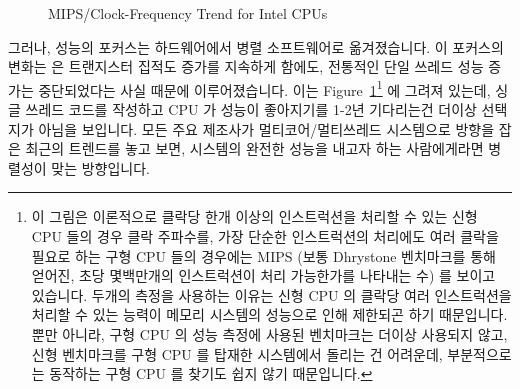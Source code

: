 \begin{figure}[tb]
\centering
{}
\caption{MIPS/Clock-Frequency Trend for Intel CPUs}
\label{fig:intro:Clock-Frequency Trend for Intel CPUs}
\end{figure}

그러나, 성능의 포커스는 하드웨어에서 병렬 소프트웨어로 옮겨졌습니다.
이 포커스의 변화는  은 트랜지스터 집적도 증가를 지속하게
함에도, 전통적인 단일 쓰레드 성능 증가는 중단되었다는 사실 때문에
이루어졌습니다.
이는
Figure~\ref{fig:intro:Clock-Frequency Trend for Intel CPUs}\footnote{
	이 그림은 이론적으로 클락당 한개 이상의 인스트럭션을 처리할 수 있는
	신형 CPU 들의 경우 클락 주파수를, 가장 단순한 인스트럭션의 처리에도
	여러 클락을 필요로 하는 구형 CPU 들의 경우에는 MIPS (보통 Dhrystone
	벤치마크를 통해 얻어진, 초당 몇백만개의 인스트럭션이 처리 가능한가를
	나타내는 수) 를 보이고 있습니다.
	두개의 측정을 사용하는 이유는 신형 CPU 의 클락당 여러 인스트럭션을
	처리할 수 있는 능력이 메모리 시스템의 성능으로 인해 제한되곤 하기
	때문입니다.
	뿐만 아니라, 구형 CPU 의 성능 측정에 사용된 벤치마크는 더이상 사용되지
	않고, 신형 벤치마크를 구형 CPU 를 탑재한 시스템에서 돌리는 건 어려운데,
	부분적으로는 동작하는 구형 CPU 를 찾기도 쉽지 않기 때문입니다.}
에 그려져 있는데, 싱글 쓰레드 코드를 작성하고 CPU 가 성능이 좋아지기를 1-2년
기다리는건 더이상 선택지가 아님을 보입니다.
모든 주요 제조사가 멀티코어/멀티쓰레드 시스템으로 방향을 잡은 최근의 트렌드를
놓고 보면, 시스템의 완전한 성능을 내고자 하는 사람에게라면 병렬성이 맞는
방향입니다.


